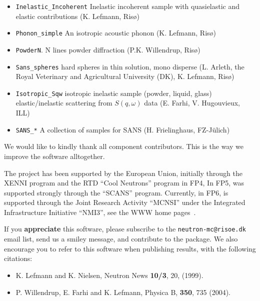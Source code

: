 \begin{itemize}
  \begin{itemize}
  \item \verb+Inelastic_Incoherent+ Inelastic incoherent sample with quasielastic and elastic contributions (K. Lefmann, Ris\o)
  \item \verb+Phonon_simple+ An isotropic acoustic phonon (K. Lefmann, Ris\o)
  \item \verb+PowderN+. N lines powder diffraction (P.K. Willendrup, Ris\o)
  \item \verb+Sans_spheres+ hard spheres in thin solution, mono disperse (L. Arleth, the Royal Veterinary and Agricultural University (DK), K. Lefmann, Ris\o )
  \item \verb+Isotropic_Sqw+ isotropic inelastic sample (powder, liquid, glass)
elastic/inelastic scattering from $S(q,\omega)$ data (E. Farhi, V. Hugouvieux, ILL)
  \item \verb+SANS_*+ A collection of samples for SANS (H. Frielinghaus,  FZ-J\"ulich)
  \end{itemize}
\end{itemize}

We would like to kindly thank all \MCS component contributors. This is the way we improve the software alltogether.

The \MCS project has been supported by the European Union, initially
through the XENNI program and the RTD ``Cool Neutrons'' program in FP4,
In FP5, \MCS was supported strongly through the
``SCANS'' program.
Currently, in FP6, \MCS is supported through the Joint Research Activity
``MCNSI'' under the Integrated Infrastructure Initiative ``NMI3'', see
the WWW home pages~\cite{mcnsi_webpage,nmi3_webpage}.

If you {\bf appreciate} this software, please subscribe to the \verb+neutron-mc@risoe.dk+ email list, send us a smiley message, and contribute to the package. We also encourage you to refer to this software when publishing results, with the following citations:
\begin{itemize}
\item{K. Lefmann and K. Nielsen, Neutron News {\bf 10/3}, 20, (1999).}
\item{P. Willendrup, E. Farhi and K. Lefmann, Physica B, {\bf 350}, 735 (2004).}
\end{itemize}







